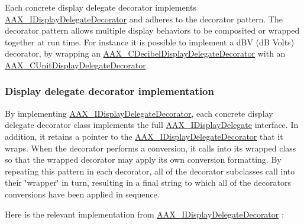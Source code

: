 Each concrete display delegate decorator implements \hyperlink{a00094}{A\+A\+X\+\_\+\+I\+Display\+Delegate\+Decorator} and adheres to the decorator pattern. The decorator pattern allows multiple display behaviors to be composited or wrapped together at run time. For instance it is possible to implement a d\+B\+V (d\+B Volts) decorator, by wrapping an \hyperlink{a00015}{A\+A\+X\+\_\+\+C\+Decibel\+Display\+Delegate\+Decorator} with an \hyperlink{a00045}{A\+A\+X\+\_\+\+C\+Unit\+Display\+Delegate\+Decorator}.\hypertarget{a00346_displaydelegates_decorators_implementation}{}\subsubsection{Display delegate decorator implementation}\label{a00346_displaydelegates_decorators_implementation}
By implementing \hyperlink{a00094}{A\+A\+X\+\_\+\+I\+Display\+Delegate\+Decorator}, each concrete display delegate decorator class implements the full \hyperlink{a00092}{A\+A\+X\+\_\+\+I\+Display\+Delegate} interface. In addition, it retains a pointer to the \hyperlink{a00094}{A\+A\+X\+\_\+\+I\+Display\+Delegate\+Decorator} that it wraps. When the decorator performs a conversion, it calls into its wrapped class so that the wrapped decorator may apply its own conversion formatting. By repeating this pattern in each decorator, all of the decorator subclasses call into their \char`\"{}wrapper\char`\"{} in turn, resulting in a final string to which all of the decorators\textquotesingle{} conversions have been applied in sequence.

Here is the relevant implementation from \hyperlink{a00094}{A\+A\+X\+\_\+\+I\+Display\+Delegate\+Decorator} \+:



